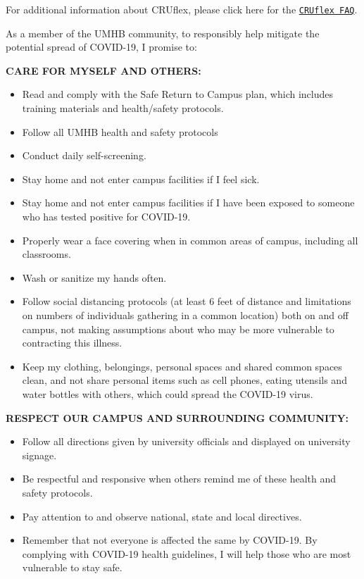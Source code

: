 \documentclass[
]{article}
\begin{document}
For additional information about CRUflex, please click here for the
\texttt{\href{https://bit.ly/3fJpoEW}{CRUflex FAQ}}.

\newpage

\begin{center}
\end{center}

\vspace{.25cm}

As a member of the UMHB community, to responsibly help mitigate the
potential spread of COVID-19, I promise to:

\textbf{CARE FOR MYSELF AND OTHERS:}

\begin{itemize}
\item Read and comply with the Safe Return to Campus plan, which includes training materials and health/safety protocols. 
\item Follow all UMHB health and safety protocols 
\item Conduct daily self-screening. 
\item Stay home and not enter campus facilities if I feel sick. 
\item Stay home and not enter campus facilities if I have been exposed to someone who has tested positive for COVID-19. 
\item Properly wear a face covering when in common areas of campus, including all classrooms. 
\item Wash or sanitize my hands often. 
\item Follow social distancing protocols (at least 6 feet of distance and limitations on numbers of individuals gathering in a common location) both on and off campus, not making assumptions about who may be more vulnerable to contracting this illness. 
\item Keep my clothing, belongings, personal spaces and shared common spaces clean, and not share personal items such as cell phones, eating utensils and water bottles with others, which could spread the COVID-19 virus.
\end{itemize}

\textbf{RESPECT OUR CAMPUS AND SURROUNDING COMMUNITY:}

\begin{itemize}
\item Follow all directions given by university officials and displayed on university signage. 
\item Be respectful and responsive when others remind me of these health and safety protocols. 
\item Pay attention to and observe national, state and local directives. 
\item Remember that not everyone is affected the same by COVID-19. By complying with COVID-19 health guidelines, I will help those who are most vulnerable to stay safe. 
\end{itemize}
\end{document}
